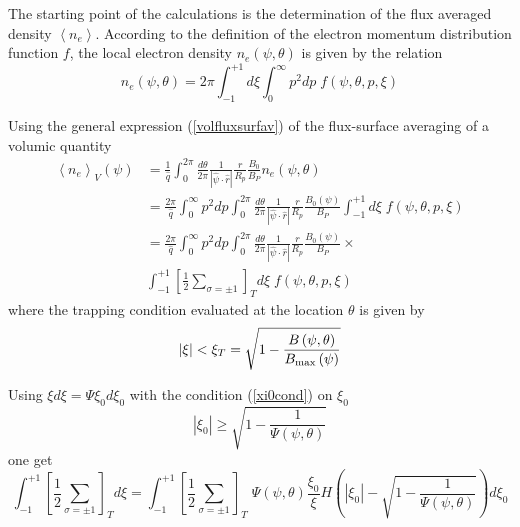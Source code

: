 The starting point of the calculations is the determination of the flux
averaged density $\left\langle n_{e}\right\rangle .$ According to the
definition of the electron momentum distribution function $f$, the local
electron density $n_{e}\left( \psi,\theta\right) $ is given by the relation
\begin{equation}
n_{e}\left( \psi,\theta\right)
=2\pi\int_{-1}^{+1}d\xi\int_{0}^{\infty}p^{2}dp\;f\left(
\psi,\theta,p,\xi\right)
\end{equation}

Using the general expression (\ref{volfluxsurfav}) of the flux-surface
averaging of a volumic quantity
\begin{align}
\left\langle n_{e}\right\rangle _{V}\left( \psi\right) & =\frac{1}{\widehat{q%
}}\int_{0}^{2\pi}\frac{d\theta}{2\pi}\frac{1}{\left| \widehat {\psi}\cdot%
\widehat{r}\right| }\frac{r}{R_{p}}\frac{B_{0}}{B_{P}}n_{e}\left(
\psi,\theta\right)  \nonumber \\
& =\frac{2\pi}{\widehat{q}}\int_{0}^{\infty}p^{2}dp\int_{0}^{2\pi}\frac{
d\theta}{2\pi}\frac{1}{\left| \widehat{\psi}\cdot\widehat{r}\right| }\frac{r%
}{R_{p}}\frac{B_{0}\left( \psi\right) }{B_{P}}\int_{-1}^{+1}d\xi\;f\left(
\psi,\theta,p,\xi\right)  \nonumber \\
& =\frac{2\pi}{\widehat{q}}\int_{0}^{\infty}p^{2}dp\int_{0}^{2\pi}\frac{
d\theta}{2\pi}\frac{1}{\left| \widehat{\psi}\cdot\widehat{r}\right| }\frac{r%
}{R_{p}}\frac{B_{0}\left( \psi\right) }{B_{P}}\times  \nonumber \\
& \int_{-1}^{+1}\left[ \frac{1}{2}\sum_{\sigma=\pm1}\right]
_{T}d\xi\;f\left( \psi,\theta,p,\xi\right)
\end{align}
where the trapping condition evaluated at the location $\theta$ is given by
\begin{equation}
\left| \xi\right| <\xi_{T}=\sqrt{1-\frac{B\left( \psi,\theta\right) }{%
B_{\max}\left( \psi\right) }}
\end{equation}

Using $\xi d\xi=\Psi\xi_{0}d\xi_{0}$ with the condition (\ref{xi0cond}) on $%
\xi_{0}$%
\begin{equation}
\left| \xi_{0}\right| \geq\sqrt{1-\frac{1}{\Psi\left( \psi,\theta\right) }}
\label{xi0cond4}
\end{equation}
one get
\begin{equation}
\int_{-1}^{+1}\left[ \frac{1}{2}\sum_{\sigma=\pm1}\right] _{T}d\xi=\int
_{-1}^{+1}\left[ \frac{1}{2}\sum_{\sigma=\pm1}\right] _{T}\;\Psi\left(
\psi,\theta\right) \frac{\xi_{0}}{\xi}H\left( \left| \xi_{0}\right| -\sqrt{1-%
\frac{1}{\Psi\left( \psi,\theta\right) }}\right) d\xi_{0}
\end{equation}

